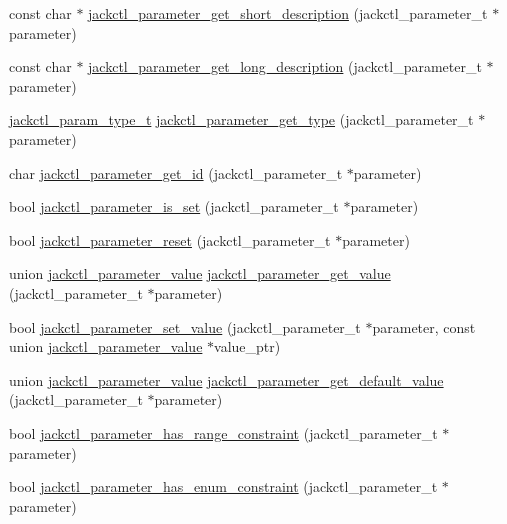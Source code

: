 \begin{DoxyCompactItemize}
\item 
const char $\ast$ \hyperlink{group__ServerControl_gaac9fe5577753455308a53f5569fe3106}{jackctl\-\_\-parameter\-\_\-get\-\_\-short\-\_\-description} (jackctl\-\_\-parameter\-\_\-t $\ast$parameter)
\item 
const char $\ast$ \hyperlink{group__ServerControl_ga97aae5c29e16539b71bc7dc2bddafc4b}{jackctl\-\_\-parameter\-\_\-get\-\_\-long\-\_\-description} (jackctl\-\_\-parameter\-\_\-t $\ast$parameter)
\item 
\hyperlink{control_8h_ac71832cf5445a694a178d15345d67840}{jackctl\-\_\-param\-\_\-type\-\_\-t} \hyperlink{group__ServerControl_ga37fe25ce3d3fdbc631a12cab91c460bb}{jackctl\-\_\-parameter\-\_\-get\-\_\-type} (jackctl\-\_\-parameter\-\_\-t $\ast$parameter)
\item 
char \hyperlink{group__ServerControl_ga864ee9036a98736910f264b1a62f0fe9}{jackctl\-\_\-parameter\-\_\-get\-\_\-id} (jackctl\-\_\-parameter\-\_\-t $\ast$parameter)
\item 
bool \hyperlink{group__ServerControl_ga439234cd9c8cb1ff35a8bffef526f04b}{jackctl\-\_\-parameter\-\_\-is\-\_\-set} (jackctl\-\_\-parameter\-\_\-t $\ast$parameter)
\item 
bool \hyperlink{group__ServerControl_gac75904b4d63158841b6f4667a7928788}{jackctl\-\_\-parameter\-\_\-reset} (jackctl\-\_\-parameter\-\_\-t $\ast$parameter)
\item 
union \hyperlink{unionjackctl__parameter__value}{jackctl\-\_\-parameter\-\_\-value} \hyperlink{group__ServerControl_ga9881e66c9c235484e5b8879ce27bc9f2}{jackctl\-\_\-parameter\-\_\-get\-\_\-value} (jackctl\-\_\-parameter\-\_\-t $\ast$parameter)
\item 
bool \hyperlink{group__ServerControl_gab769622731339e7d35e3b7093db347e6}{jackctl\-\_\-parameter\-\_\-set\-\_\-value} (jackctl\-\_\-parameter\-\_\-t $\ast$parameter, const union \hyperlink{unionjackctl__parameter__value}{jackctl\-\_\-parameter\-\_\-value} $\ast$value\-\_\-ptr)
\item 
union \hyperlink{unionjackctl__parameter__value}{jackctl\-\_\-parameter\-\_\-value} \hyperlink{group__ServerControl_gaa71bfc637794e50ccd5c39d0449b982a}{jackctl\-\_\-parameter\-\_\-get\-\_\-default\-\_\-value} (jackctl\-\_\-parameter\-\_\-t $\ast$parameter)
\item 
bool \hyperlink{group__ServerControl_gae7228c1726b5ecaae6458134bf4ab4d7}{jackctl\-\_\-parameter\-\_\-has\-\_\-range\-\_\-constraint} (jackctl\-\_\-parameter\-\_\-t $\ast$parameter)
\item 
bool \hyperlink{group__ServerControl_ga823ae164d023267b57002226444fe708}{jackctl\-\_\-parameter\-\_\-has\-\_\-enum\-\_\-constraint} (jackctl\-\_\-parameter\-\_\-t $\ast$parameter)

\end{DoxyCompactItemize}
